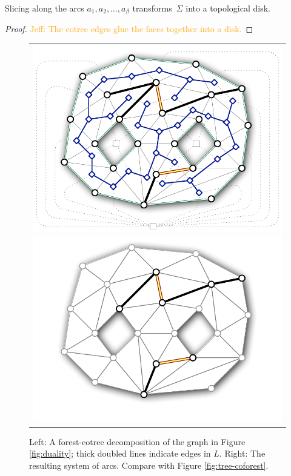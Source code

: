 \documentclass[letterpaper,review]{siamart190516}
\def\jnote#1{\textcolor{orange}{Jeff: #1}}
\begin{document}
\begin{lemma}
Slicing along the arcs $a_1, a_2, \dots, a_\beta$ transforms~$\Sigma$ into a topological disk.
\end{lemma}

\begin{proof}
\jnote{The cotree edges glue the faces together into a disk.}
\end{proof}

\begin{figure}[htb]
\centering\footnotesize\sf
\begin{tabular}{c}
\includegraphics[scale=0.45]{Fig/forest-cotree2} \qquad
\includegraphics[scale=0.45]{Fig/forest-cotree-arcs2}
\end{tabular}
\caption{Left: A forest-cotree decomposition of the graph in Figure \ref{fig:duality}; thick doubled lines indicate edges in $L$.
Right: The resulting system of arcs.  Compare with Figure \ref{fig:tree-coforest}.}
\label{fig:forest-cotree}
\end{figure}
\end{document}
